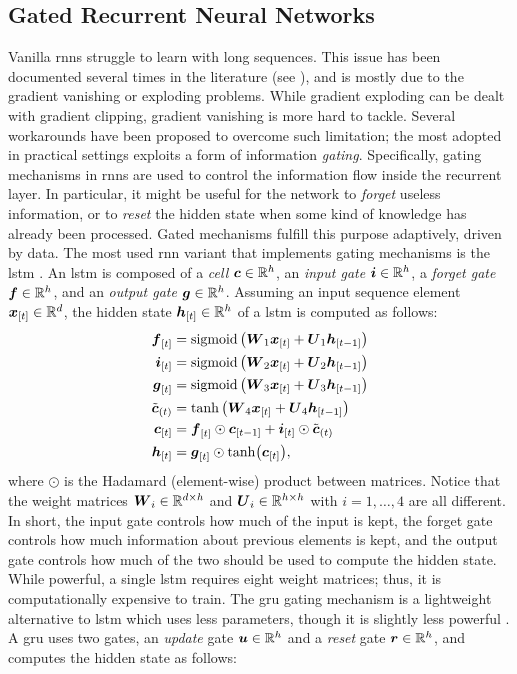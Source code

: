 \subsection{Gated Recurrent Neural Networks}
Vanilla \glspl{rnn} struggle to learn with long sequences. This issue has been documented several times in the literature (see \eg \citep{bengio1994learninglongtermdependenciesdifficult}), and is mostly due to the gradient vanishing or exploding problems. While gradient exploding can be dealt with gradient clipping, gradient vanishing is more hard to tackle. Several workarounds have been proposed to overcome such limitation; the most adopted in practical settings exploits a form of information \emph{gating}. Specifically, gating mechanisms in \glspl{rnn} are used to control the information flow inside the recurrent layer. In particular, it might be useful for the network to \emph{forget} useless information, or to \emph{reset} the hidden state when some kind of knowledge has already been processed. Gated mechanisms fulfill this purpose adaptively, driven by data. The most used \gls{rnn} variant that implements gating mechanisms is the \gls{lstm} \citep{hochreiter1997lstm}.
An \gls{lstm} is composed of a \emph{cell} $\Vector{c} \in \Real^h$, an \emph{input gate} $\Vector{i} \in \Real^h$, a \emph{forget gate} $\Vector{f} \in \Real^h$, and an \emph{output gate} $\Vector{g} \in \Real^h$. Assuming an input sequence element $\Elem{x}{t} \in \Real^d$, the hidden state $\Elem{h}{t} \in \Real^h$ of a \gls{lstm} is computed as follows:
\begin{align*}
    \Elem{f}{t} &= \sigmoid\Par{\Matrix{W}_{1}\Elem{x}{t} + \Matrix{U}_{1}\Elem{h}{t-1}}\\
    \Elem{i}{t} &= \sigmoid\Par{\Matrix{W}_{2}\Elem{x}{t} + \Matrix{U}_{2}\Elem{h}{t-1}}\\
    \Elem{g}{t} &= \sigmoid\Par{\Matrix{W}_{3}\Elem{x}{t} + \Matrix{U}_{3}\Elem{h}{t-1}}\\
    \tilde{\Vector{c}}_{(t)} &= \tanh\Par{\Matrix{W}_{4}\Elem{x}{t} + \Matrix{U}_{4}\Elem{h}{t-1}}\\
    \Elem{c}{t} &= \Elem{f}{t} \odot \Elem{c}{t-1} + \Elem{i}{t} \odot \tilde{\Vector{c}}_{(t)}\\
    \Elem{h}{t} &= \Elem{g}{t} \odot \tanh(\Elem{c}{t}),
\end{align*}
where $\odot$ is the Hadamard (element-wise) product between matrices. Notice that the weight matrices $\Matrix{W}_i \in \Real^{d \times h}$ and $\Matrix{U}_i \in \Real^{h \times h}$ with $i=1, \ldots, 4$ are all different. In short, the input gate controls how much of the input is kept, the forget gate controls how much information about previous elements is kept, and the output gate controls how much of the two should be used to compute the hidden state. While powerful, a single \gls{lstm} requires eight weight matrices; thus, it is computationally expensive to train. The \gls{gru} \citep{cho2014gru} gating mechanism is a lightweight alternative to \gls{lstm} which uses less parameters, though it is slightly less powerful \citep{gruber2020gruspecificlstm}. A \gls{gru} uses two gates, an \emph{update} gate $\Vector{u} \in \Real^h$ and a \emph{reset} gate $\Vector{r} \in \Real^h$, and computes the hidden state as follows:
